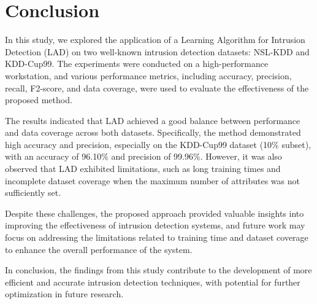 \documentclass[pdflatex,sn-mathphys-num]{sn-jnl}%
\theoremstyle{thmstyleone}%
\theoremstyle{thmstyletwo}%
\theoremstyle{thmstylethree}%
\begin{document}
\section{Conclusion} \label{sec:Conclusion}

In this study, we explored the application of a Learning Algorithm for Intrusion Detection (LAD) on two well-known intrusion detection datasets: NSL-KDD and KDD-Cup99. The experiments were conducted on a high-performance workstation, and various performance metrics, including accuracy, precision, recall, F2-score, and data coverage, were used to evaluate the effectiveness of the proposed method. 

The results indicated that LAD achieved a good balance between performance and data coverage across both datasets. Specifically, the method demonstrated high accuracy and precision, especially on the KDD-Cup99 dataset (10\% subset), with an accuracy of 96.10\% and precision of 99.96\%. However, it was also observed that LAD exhibited limitations, such as long training times and incomplete dataset coverage when the maximum number of attributes was not sufficiently set.

Despite these challenges, the proposed approach provided valuable insights into improving the effectiveness of intrusion detection systems, and future work may focus on addressing the limitations related to training time and dataset coverage to enhance the overall performance of the system. 

In conclusion, the findings from this study contribute to the development of more efficient and accurate intrusion detection techniques, with potential for further optimization in future research.






\end{document}
